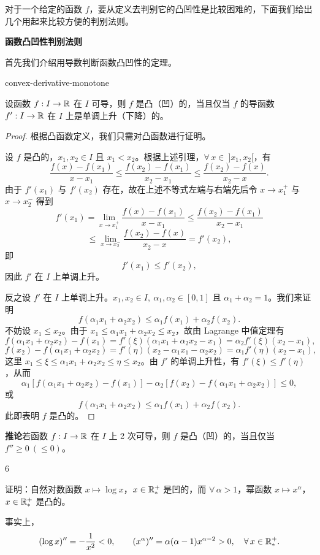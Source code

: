 对于一个给定的函数 \(f\)，要从定义去判别它的凸凹性是比较困难的，下面我们给出几个用起来比较方便的判别法则。

\textbf{函数凸凹性判别法则}

首先我们介绍用导数判断函数凸凹性的定理。

\begin{mythm}{}{convex-derivative-monotone}

	设函数 \(f:I\to\mathbb{R}\) 在 \(I\) 可导，则 \(f\) 是凸（凹）的，当且仅当 \(f\) 的导函数 \(f':I\to\mathbb{R}\) 在 \(I\) 上是单调上升（下降）的。

\end{mythm}

\begin{proof}

	根据凸函数定义，我们只需对凸函数进行证明。

	设 \(f\) 是凸的，\(x_1,x_2\in I\) 且 \(x_1<x_2\)。根据上述引理，\(\forall\,x\in\ ]x_1,x_2[\)，有
	\[
	\frac{f(x)-f(x_1)}{x-x_1}\le\frac{f(x_2)-f(x_1)}{x_2-x_1}\le\frac{f(x_2)-f(x)}{x_2-x}.
	\]
	由于 \(f'(x_1)\) 与 \(f'(x_2)\) 存在，故在上述不等式左端与右端先后令 \(x\to x_1^+\) 与 \(x\to x_2^-\) 得到
	\[
	f'(x_1)=\lim_{x\to x_1^+}\frac{f(x)-f(x_1)}{x-x_1}\le\frac{f(x_2)-f(x_1)}{x_2-x_1}
	\]
	\[
	\le\lim_{x\to x_2^-}\frac{f(x_2)-f(x)}{x_2-x}=f'(x_2),
	\]
	即
	\[
	f'(x_1)\le f'(x_2),
	\]
	因此 \(f'\) 在 \(I\) 上单调上升。

	反之设 \(f'\) 在 \(I\) 上单调上升。\(x_1,x_2\in I,\ \alpha_1,\alpha_2\in[0,1]\) 且 \(\alpha_1+\alpha_2=1\)。我们来证明
	\[
	f(\alpha_1x_1+\alpha_2x_2)\le\alpha_1f(x_1)+\alpha_2f(x_2).
	\]
	不妨设 \(x_1\le x_2\)。由于 \(x_1\le\alpha_1x_1+\alpha_2x_2\le x_2\)，故由 Lagrange 中值定理有
	\[
	f(\alpha_1x_1+\alpha_2x_2)-f(x_1)=f'(\xi)(\alpha_1x_1+\alpha_2x_2-x_1)=\alpha_2f'(\xi)(x_2-x_1),
	\]
	\[
	f(x_2)-f(\alpha_1x_1+\alpha_2x_2)=f'(\eta)(x_2-\alpha_1x_1-\alpha_2x_2)=\alpha_1f'(\eta)(x_2-x_1),
	\]
	这里 \(x_1\le\xi\le\alpha_1x_1+\alpha_2x_2\le\eta\le x_2\)。由 \(f'\) 的单调上升性，有 \(f'(\xi)\le f'(\eta)\)，从而
	\[
	\alpha_1[f(\alpha_1x_1+\alpha_2x_2)-f(x_1)]-\alpha_2[f(x_2)-f(\alpha_1x_1+\alpha_2x_2)]\le0,
	\]
	或
	\[
	f(\alpha_1x_1+\alpha_2x_2)\le\alpha_1f(x_1)+\alpha_2f(x_2).
	\]
	此即表明 \(f\) 是凸的。

\end{proof}

\textbf{推论}\quad 若函数 \(f:I\to\mathbb{R}\) 在 \(I\) 上 2 次可导，则 \(f\) 是凸（凹）的，当且仅当 \(f''\ge0\ (\le0)\)。

\begin{sourceexample}{6}

	证明：自然对数函数 \(x\longmapsto\log x\)，\(x\in\mathbb{R}_*^+\) 是凹的，而 \(\forall\,\alpha>1\)，幂函数 \(x\longmapsto x^\alpha\)，\(x\in\mathbb{R}_*^+\) 是凸的。

	事实上，
	\[
	(\log x)''=-\frac1{x^2}<0,\qquad(x^\alpha)''=\alpha(\alpha-1)x^{\alpha-2}>0,\quad\forall\,x\in\mathbb{R}_*^+.
	\]

\end{sourceexample}

